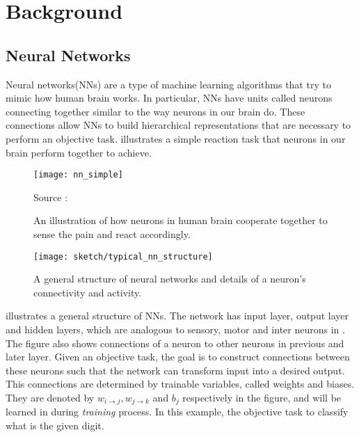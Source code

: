 \chapter{Background}\label{cha:chapter3}

\section{Neural Networks}
Neural networks(NNs) are a type of machine learning algorithms that try to mimic how human brain works.  In particular, NNs have units called neurons connecting together similar to the way neurons in our brain do. These connections allow NNs to build hierarchical representations that are necessary to perform an objective task. \addfigure{\ref{fig:nn_simple}} illustrates a simple reaction task that neurons in our brain perform together to achieve.

 \begin{figure}[ht!]
    \begin{center}

\texttt{[image: nn\_simple]}
\caption{An illustration of how neurons in human brain cooperate together to sense the pain and react accordingly.}
\small{Source : \cite{LeonMakingSimpleNeural2017}}
\label{fig:nn_simple}

\end{center}
\end{figure}

 \begin{figure}[ht!]
    \begin{center}

\texttt{[image: sketch/typical\_nn\_structure]}
\caption[]{A general structure of neural networks and details of a neuron's connectivity and activity.}
\label{fig:nn_typical_structure}

\end{center}
\end{figure}


%


\addfigure{\ref{fig:nn_typical_structure}} illustrates a general structure of NNs. The network has input layer, output layer and hidden layers, which are analogous to sensory, motor and inter neurons in \addfigure{\ref{fig:nn_simple}}. The figure also shows connections of a neuron to other neurons in previous and later layer. Given an objective task, the goal is to construct connections between these neurons such that the network can transform input into a desired output.  This connections are determined by trainable variables, called weights and biases. They are denoted by $w_{i\rightarrow j}, w_{j\rightarrow k}$ and $b_j$ respectively in the figure, and will be learned  in during \textit{training} process.  In this example, the objective task to classify what is the given digit.


